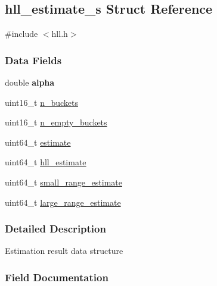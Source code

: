 \hypertarget{structhll__estimate__s}{}\subsection{hll\+\_\+estimate\+\_\+s Struct Reference}
\label{structhll__estimate__s}


{\ttfamily \#include $<$hll.\+h$>$}

\subsubsection*{Data Fields}
\begin{DoxyCompactItemize}
\item 
\mbox{\label{structhll__estimate__s_ace8957a5abbf4554e722159d2933e6b9}} 
double {\bfseries alpha}
\item 
uint16\+\_\+t \hyperlink{structhll__estimate__s_a6124b7e8334b402dc3f7d2855642767b}{n\+\_\+buckets}
\item 
uint16\+\_\+t \hyperlink{structhll__estimate__s_a0c7a468e18e2b31792f28f300dddc83f}{n\+\_\+empty\+\_\+buckets}
\item 
uint64\+\_\+t \hyperlink{structhll__estimate__s_a6d651ad449a38baa6a5a47d9361155d6}{estimate}
\item 
uint64\+\_\+t \hyperlink{structhll__estimate__s_a44153272b5b7925bbe518645a3f146d0}{hll\+\_\+estimate}
\item 
uint64\+\_\+t \hyperlink{structhll__estimate__s_acfa1e2f8075ca50adcbc6cfec4a86e28}{small\+\_\+range\+\_\+estimate}
\item 
uint64\+\_\+t \hyperlink{structhll__estimate__s_ae6e8601592aec248a11f378e1b946f60}{large\+\_\+range\+\_\+estimate}
\end{DoxyCompactItemize}


\subsubsection{Detailed Description}
Estimation result data structure 

\subsubsection{Field Documentation}
\mbox{\label{structhll__estimate__s_a6124b7e8334b402dc3f7d2855642767b}} 
